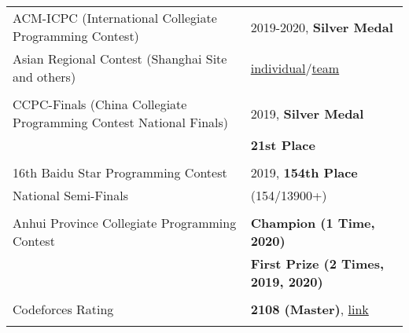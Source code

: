 \documentclass[a4paper,12pt]{article}
\begin{document}
\begin{tabularx}{\linewidth}{@{}l X@{}}
ACM-ICPC (International Collegiate Programming Contest) & 2019-2020, \textbf{Silver Medal}\\
\normalsize{Asian Regional Contest (Shanghai Site and others)} & \href{https://zhishanq.github.io/images/ICPC_Individual.pdf}{individual}/\href{https://zhishanq.github.io/images/ICPC_Team.pdf}{team}\\
\\
CCPC-Finals (China Collegiate Programming Contest National Finals) & \normalsize{2019, \textbf{Silver Medal}}\\
& \normalsize{\textbf{21st Place}}\\
\\
16th Baidu Star Programming Contest & \normalsize{2019, \textbf{154th Place}}\\
\normalsize{National Semi-Finals}&(154/13900+)\\
\\
Anhui Province Collegiate Programming Contest & \normalsize{\textbf{Champion (1 Time, 2020)}}\\
& \normalsize{\textbf{First Prize (2 Times, 2019, 2020)}}\\
\\
Codeforces Rating & \normalsize{\textbf{2108 (Master)}, \href{https://codeforces.com/profile/QieziMin}{link}}\\
\\
\end{tabularx}




\vfill
{}
\end{document}
